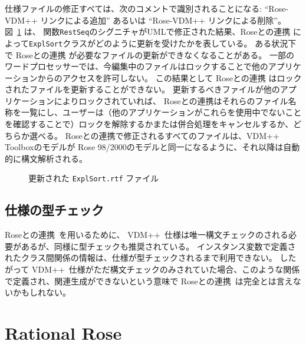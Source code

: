 \documentclass[\pformat,12pt]{jarticle}
\newcommand{\vdmpp}{VDM++}
\newcommand{\ToolboxName}{\vdmpp{} Toolbox}
\newcommand{\link}{Roseとの連携}
\newcommand{\rose}{Rose 98/2000}
\begin{document}
仕様ファイルの修正すべては、次のコメントで識別されることになる: ``Rose-VDM++ リンクによる追加'' あるいは ``Rose-VDM++ リンクによる削除''。
図~\ref{fig:update} は、 関数{\tt  RestSeq}のシグニチャがUMLで修正された結果、\link{} によって{\tt ExplSort}クラスがどのように更新を受けたかを表している。
ある状況下で \link{} が必要なファイルの更新ができなくなることがある。
一部のワードプロセッサーでは、今編集中のファイルはロックすることで他のアプリケーションからのアクセスを許可しない。
この結果として \link{} はロックされたファイルを更新することができない。
更新するべきファイルが他のアプリケーションによりロックされていれば、 \link{}はそれらのファイル名称を一覧にし、ユーザーは（他のアプリケーションがこれらを使用中でないことを確認することで）ロックを解除するかまたは併合処理をキャンセルするか、どちらか選べる。
\link{}で修正されるすべてのファイルは、\ToolboxName{}のモデルが \rose{}のモデルと同一になるように、それ以降は自動的に構文解析される。

\begin{figure}[htb]
\begin{center}
\mbox{}
\caption{更新された {\tt ExplSort.rtf} ファイル　\label{fig:update}}
\end{center}
\end{figure}


\subsection{仕様の型チェック} \label{sec:typecheck}

 \link\ を用いるために、 \vdmpp\ 仕様は唯一構文チェックのされる必要があるが、同様に型チェックも推奨されている。
インスタンス変数で定義されたクラス間関係の情報は、仕様が型チェックされるまで利用できない。
したがって \vdmpp\ 仕様がただ構文チェックのみされていた場合、このような関係で定義され、関連生成ができないという意味で \link\ は完全とは言えないかもしれない。

\newpage  
\section{Rational Rose} \label{rose98}
  
\end{document}
